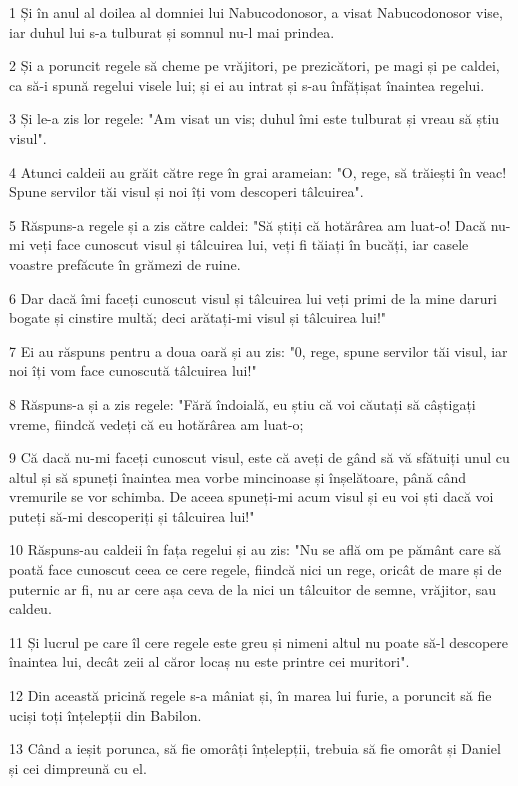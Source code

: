 \par 1 Și în anul al doilea al domniei lui Nabucodonosor, a visat Nabucodonosor vise, iar duhul lui s-a tulburat și somnul nu-l mai prindea.
\par 2 Și a poruncit regele să cheme pe vrăjitori, pe prezicători, pe magi și pe caldei, ca să-i spună regelui visele lui; și ei au intrat și s-au înfățișat înaintea regelui.
\par 3 Și le-a zis lor regele: "Am visat un vis; duhul îmi este tulburat și vreau să știu visul".
\par 4 Atunci caldeii au grăit către rege în grai arameian: "O, rege, să trăiești în veac! Spune servilor tăi visul și noi îți vom descoperi tâlcuirea".
\par 5 Răspuns-a regele și a zis către caldei: "Să știți că hotărârea am luat-o! Dacă nu-mi veți face cunoscut visul și tâlcuirea lui, veți fi tăiați în bucăți, iar casele voastre prefăcute în grămezi de ruine.
\par 6 Dar dacă îmi faceți cunoscut visul și tâlcuirea lui veți primi de la mine daruri bogate și cinstire multă; deci arătați-mi visul și tâlcuirea lui!"
\par 7 Ei au răspuns pentru a doua oară și au zis: "0, rege, spune servilor tăi visul, iar noi îți vom face cunoscută tâlcuirea lui!"
\par 8 Răspuns-a și a zis regele: "Fără îndoială, eu știu că voi căutați să câștigați vreme, fiindcă vedeți că eu hotărârea am luat-o;
\par 9 Că dacă nu-mi faceți cunoscut visul, este că aveți de gând să vă sfătuiți unul cu altul și să spuneți înaintea mea vorbe mincinoase și înșelătoare, până când vremurile se vor schimba. De aceea spuneți-mi acum visul și eu voi ști dacă voi puteți să-mi descoperiți și tâlcuirea lui!"
\par 10 Răspuns-au caldeii în fața regelui și au zis: "Nu se află om pe pământ care să poată face cunoscut ceea ce cere regele, fiindcă nici un rege, oricât de mare și de puternic ar fi, nu ar cere așa ceva de la nici un tâlcuitor de semne, vrăjitor, sau caldeu.
\par 11 Și lucrul pe care îl cere regele este greu și nimeni altul nu poate să-l descopere înaintea lui, decât zeii al căror locaș nu este printre cei muritori".
\par 12 Din această pricină regele s-a mâniat și, în marea lui furie, a poruncit să fie uciși toți înțelepții din Babilon.
\par 13 Când a ieșit porunca, să fie omorâți înțelepții, trebuia să fie omorât și Daniel și cei dimpreună cu el.
